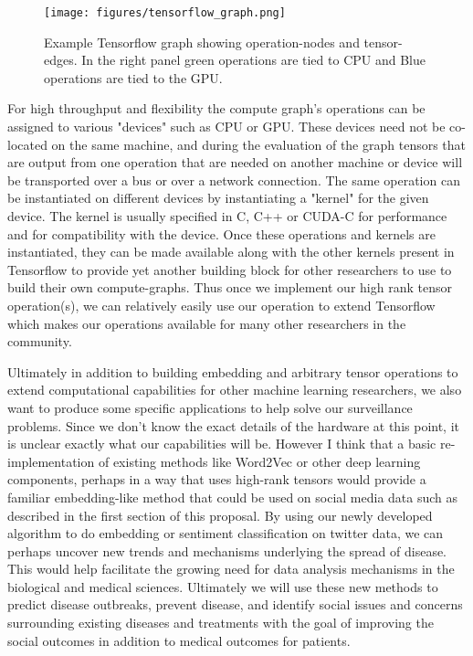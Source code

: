 \begin{figure*}
\centering
\texttt{[image: figures/tensorflow\_graph.png]}
\caption{Example Tensorflow graph showing operation-nodes and tensor-edges. In the right panel green operations are tied to CPU and Blue operations are tied to the GPU.}
\label{fig:lda}
\end{figure*}

For high throughput and flexibility the compute graph's operations can be assigned to various "devices" such as CPU or GPU. These devices need not be co-located on the same machine, and during the evaluation of the graph tensors that are output from one operation that are needed on another machine or device will be transported over a bus or over a network connection. The same operation can be instantiated on different devices by instantiating a "kernel" for the given device. The kernel is usually specified in C, C++ or CUDA-C for performance and for compatibility with the device. Once these operations and kernels are instantiated, they can be made available along with the other kernels present in Tensorflow to provide yet another building block for other researchers to use to build their own compute-graphs. Thus once we implement our high rank tensor operation(s), we can relatively easily use our operation to extend Tensorflow which makes our operations available for many other researchers in the community.

Ultimately in addition to building embedding and arbitrary tensor operations to extend computational capabilities for other machine learning researchers, we also want to produce some specific applications to help solve our surveillance problems. Since we don't know the exact details of the hardware at this point, it is unclear exactly what our capabilities will be. However I think that a basic re-implementation of existing methods like Word2Vec or other deep learning components, perhaps in a way that uses high-rank tensors would provide a familiar embedding-like method that could be used on social media data such as described in the first section of this proposal. By using our newly developed algorithm to do embedding or sentiment classification on twitter data, we can perhaps uncover new trends and mechanisms underlying the spread of disease. This would help facilitate the growing need for data analysis mechanisms in the biological and medical sciences\cite{cichocki2014era}. Ultimately we will use these new methods to predict disease outbreaks, prevent disease, and identify social issues and concerns surrounding existing diseases and treatments with the goal of improving the social outcomes in addition to medical outcomes for patients.


